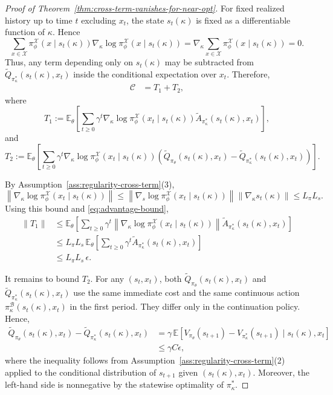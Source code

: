 \documentclass[10pt,a4paper]{amsart}
\begin{document}
\begin{proof}[Proof of Theorem~\ref{thm:cross-term-vanishes-for-near-opt}]
For fixed realized history up to time $t$ excluding $x_t$, the state
$s_t(\kappa)$ is fixed as a differentiable function of $\kappa$. Hence
\[
\sum_{x\in\mathcal X}
\pi^{\mathcal X}_\phi(x\mid s_t(\kappa))
\nabla_\kappa \log \pi^{\mathcal X}_\phi(x\mid s_t(\kappa))
=
\nabla_\kappa
\sum_{x\in\mathcal X}
\pi^{\mathcal X}_\phi(x\mid s_t(\kappa))
=0.
\]
Thus, any term depending only on $s_t(\kappa)$ may be subtracted from
$\tilde Q_{\pi^*_\kappa}(s_t(\kappa),x_t)$ inside the conditional expectation over $x_t$.
Therefore,
\begin{align*}
\mathcal C
&=
T_1+T_2,
\end{align*}
where
\[
T_1
:=
\mathbb{E}_{\theta}\!\left[
\sum_{t\geq 0}\gamma^t
\nabla_{\kappa}\log \pi^{\mathcal X}_{\phi}
\!\left(x_t\mid s_t(\kappa)\right)
\tilde A_{\pi^*_\kappa}(s_t(\kappa),x_t)
\right],
\]
and
\[
T_2
:=
\mathbb{E}_{\theta}\!\left[
\sum_{t\geq 0}\gamma^t
\nabla_{\kappa}\log \pi^{\mathcal X}_{\phi}
\!\left(x_t\mid s_t(\kappa)\right)
\left(
\tilde Q_{\pi_\theta}(s_t(\kappa),x_t)
-
\tilde Q_{\pi^*_\kappa}(s_t(\kappa),x_t)
\right)
\right].
\]

By Assumption~\ref{ass:regularity-cross-term}(3),
\[
\left\|
\nabla_{\kappa}\log \pi^{\mathcal X}_{\phi}
(x_t\mid s_t(\kappa))
\right\|
\leq
\left\|
\nabla_s \log \pi^{\mathcal X}_{\phi}
(x_t\mid s_t(\kappa))
\right\|
\left\|
\nabla_\kappa s_t(\kappa)
\right\|
\leq
L_\pi L_s.
\]
Using this bound and \eqref{eq:advantage-bound},
\begin{align*}
\|T_1\|
&\leq
\mathbb{E}_{\theta}\!\left[
\sum_{t\geq 0}\gamma^t
\left\|
\nabla_{\kappa}\log \pi^{\mathcal X}_{\phi}
(x_t\mid s_t(\kappa))
\right\|
\tilde A_{\pi^*_\kappa}(s_t(\kappa),x_t)
\right] \\
&\leq
L_\pi L_s\,
\mathbb{E}_{\theta}\!\left[
\sum_{t\geq 0}\gamma^t
\tilde A_{\pi^*_\kappa}(s_t(\kappa),x_t)
\right] \\
&\leq
L_\pi L_s\,\epsilon.
\end{align*}

It remains to bound $T_2$. For any $(s_t,x_t)$, both
$\tilde Q_{\pi_\theta}(s_t(\kappa),x_t)$ and $\tilde Q_{\pi^*_\kappa}(s_t(\kappa),x_t)$ use the
same immediate cost and the same continuous action
$\pi^{\mathcal B}_{\kappa}(s_t(\kappa),x_t)$ in the first period. They differ
only in the continuation policy. Hence,
\begin{align}
\label{eq:q-difference-bound}
\tilde Q_{\pi_\theta}(s_t(\kappa),x_t)
-
\tilde Q_{\pi^*_\kappa}(s_t(\kappa),x_t)
&=
\gamma\,
\mathbb{E}\!\left[
V_{\pi_\theta}(s_{t+1})
-
V_{\pi^*_\kappa}(s_{t+1})
\mid s_t(\kappa),x_t
\right] \\
&\leq
\gamma C\epsilon,
\nonumber
\end{align}
where the inequality follows from Assumption~\ref{ass:regularity-cross-term}(2)
applied to the conditional distribution of $s_{t+1}$ given $(s_t(\kappa),x_t)$.
Moreover, the left-hand side is nonnegative by the statewise optimality of
$\pi^*_\kappa$.


\end{proof}
\end{document}
